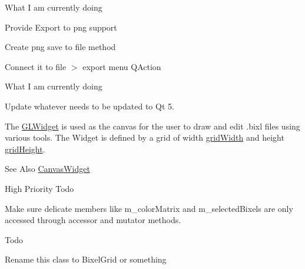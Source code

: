 \begin{DoxyRefDesc}{What I am currently doing}
\item[\hyperlink{task__task000003}{What I am currently doing}]Provide Export to png support
\begin{DoxyItemize}
\item Create png save to file method
\item Connect it to file $>$ export menu Q\-Action
\end{DoxyItemize}\end{DoxyRefDesc}


\begin{DoxyRefDesc}{What I am currently doing}
\item[\hyperlink{task__task000004}{What I am currently doing}]Update whatever needs to be updated to Qt 5. \end{DoxyRefDesc}
The \hyperlink{classGLWidget}{G\-L\-Widget} is used as the canvas for the user to draw and edit .bixl files using various tools. The Widget is defined by a grid of width \hyperlink{classGLWidget_a272046b9cb9f26f5b382f9a121672570}{grid\-Width} and height \hyperlink{classGLWidget_a419c32eef067d7157b00904dd52bdb8b}{grid\-Height}.

\begin{DoxySeeAlso}{See Also}
\hyperlink{classCanvasWidget}{Canvas\-Widget} 
\end{DoxySeeAlso}
\begin{DoxyRefDesc}{High Priority Todo}
\item[\hyperlink{todo1__todo1000001}{High Priority Todo}]Make sure delicate members like m\-\_\-color\-Matrix and m\-\_\-selected\-Bixels are only accessed through accessor and mutator methods. \end{DoxyRefDesc}
\begin{DoxyRefDesc}{Todo}
\item[\hyperlink{todo__todo000010}{Todo}]Rename this class to Bixel\-Grid or something \end{DoxyRefDesc}


